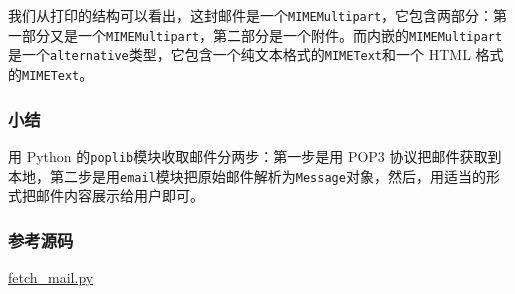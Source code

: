 我们从打印的结构可以看出，这封邮件是一个\texttt{MIMEMultipart}，它包含两部分：第一部分又是一个\texttt{MIMEMultipart}，第二部分是一个附件。而内嵌的\texttt{MIMEMultipart}是一个\texttt{alternative}类型，它包含一个纯文本格式的\texttt{MIMEText}和一个
HTML 格式的\texttt{MIMEText}。

\hypertarget{ux5c0fux7ed3}{%
\subsubsection{小结}\label{ux5c0fux7ed3}}

用 Python 的\texttt{poplib}模块收取邮件分两步：第一步是用 POP3
协议把邮件获取到本地，第二步是用\texttt{email}模块把原始邮件解析为\texttt{Message}对象，然后，用适当的形式把邮件内容展示给用户即可。

\hypertarget{ux53c2ux8003ux6e90ux7801}{%
\subsubsection{参考源码}\label{ux53c2ux8003ux6e90ux7801}}

\href{https://github.com/michaelliao/learn-python3/blob/master/samples/mail/fetch_mail.py}{fetch\_mail.py}

